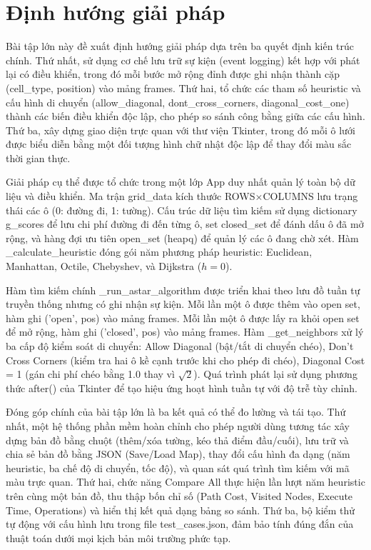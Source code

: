 \documentclass[../BTL.tex]{subfiles}
\begin{document}
\section{Định hướng giải pháp}
\label{section:1.3}

Bài tập lớn này đề xuất định hướng giải pháp dựa trên ba quyết định kiến trúc chính. Thứ nhất, sử dụng cơ chế lưu trữ sự kiện (event logging) kết hợp với phát lại có điều khiển, trong đó mỗi bước mở rộng đỉnh được ghi nhận thành cặp (cell\_type, position) vào mảng frames. Thứ hai, tổ chức các tham số heuristic và cấu hình di chuyển (allow\_diagonal, dont\_cross\_corners, diagonal\_cost\_one) thành các biến điều khiển độc lập, cho phép so sánh công bằng giữa các cấu hình. Thứ ba, xây dựng giao diện trực quan với thư viện Tkinter, trong đó mỗi ô lưới được biểu diễn bằng một đối tượng hình chữ nhật độc lập để thay đổi màu sắc thời gian thực.

Giải pháp cụ thể được tổ chức trong một lớp App duy nhất quản lý toàn bộ dữ liệu và điều khiển. Ma trận grid\_data kích thước ROWS×COLUMNS lưu trạng thái các ô (0: đường đi, 1: tường). Cấu trúc dữ liệu tìm kiếm sử dụng dictionary g\_scores để lưu chi phí đường đi đến từng ô, set closed\_set để đánh dấu ô đã mở rộng, và hàng đợi ưu tiên open\_set (heapq) để quản lý các ô đang chờ xét. Hàm \_calculate\_heuristic đóng gói năm phương pháp heuristic: Euclidean, Manhattan, Octile, Chebyshev, và Dijkstra (\(h=0\)).

Hàm tìm kiếm chính \_run\_astar\_algorithm được triển khai theo lưu đồ tuần tự truyền thống nhưng có ghi nhận sự kiện. Mỗi lần một ô được thêm vào open set, hàm ghi ('open', pos) vào mảng frames. Mỗi lần một ô được lấy ra khỏi open set để mở rộng, hàm ghi ('closed', pos) vào mảng frames. Hàm \_get\_neighbors xử lý ba cấp độ kiểm soát di chuyển: Allow Diagonal (bật/tắt di chuyển chéo), Don't Cross Corners (kiểm tra hai ô kề cạnh trước khi cho phép đi chéo), Diagonal Cost = 1 (gán chi phí chéo bằng 1.0 thay vì \(\sqrt{2}\)). Quá trình phát lại sử dụng phương thức after() của Tkinter để tạo hiệu ứng hoạt hình tuần tự với độ trễ tùy chỉnh.

Đóng góp chính của bài tập lớn là ba kết quả có thể đo lường và tái tạo. Thứ nhất, một hệ thống phần mềm hoàn chỉnh cho phép người dùng tương tác xây dựng bản đồ bằng chuột (thêm/xóa tường, kéo thả điểm đầu/cuối), lưu trữ và chia sẻ bản đồ bằng JSON (Save/Load Map), thay đổi cấu hình đa dạng (năm heuristic, ba chế độ di chuyển, tốc độ), và quan sát quá trình tìm kiếm với mã màu trực quan. Thứ hai, chức năng Compare All thực hiện lần lượt năm heuristic trên cùng một bản đồ, thu thập bốn chỉ số (Path Cost, Visited Nodes, Execute Time, Operations) và hiển thị kết quả dạng bảng so sánh. Thứ ba, bộ kiểm thử tự động với cấu hình lưu trong file test\_cases.json, đảm bảo tính đúng đắn của thuật toán dưới mọi kịch bản môi trường phức tạp.
\end{document}
